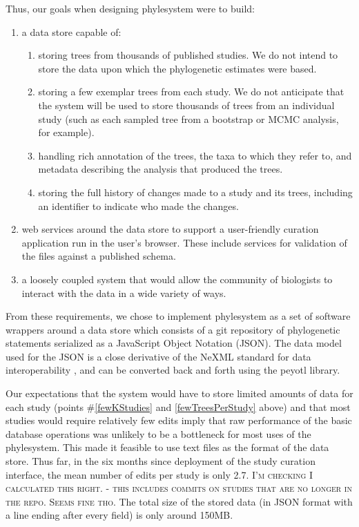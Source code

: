 \documentclass{bioinfo}
\newcommand{\ps}{phylesystem\xspace}
\newcommand{\js}{JavaScript\xspace}
\newcommand{\ejmcomment}[1]{{\color{green} \textsc{#1}}\xspace}
\begin{document}
Thus, our goals when designing \ps were to build: 
\begin{enumerate}
    \item  a data store capable of:
        \begin{enumerate}
            \item \label{fewKStudies} storing trees from thousands of published studies. We do not intend to store the 
                data upon which the phylogenetic estimates were based.
            \item \label{fewTreesPerStudy} storing a few exemplar trees from each study. We do not anticipate that the system will be used 
                to store thousands of trees from 
                an individual study (such as each sampled tree from a bootstrap or MCMC analysis, for example).
            \item \label{richAnnot} handling rich annotation of the trees, the taxa to which they refer to, and metadata describing 
                the analysis that produced the trees.
            \item \label{history} storing the full history of changes made to a study and its trees,
                including an identifier to indicate who made the changes.
        \end{enumerate}
    \item \label{ws} web services around the data store to support a user-friendly curation application run in the user's browser. These include services for validation of the files against a published schema.
    \item \label{looseOpen} a loosely coupled system that would allow the community of biologists to interact with the data in a wide variety of ways.
\end{enumerate}
From these requirements, we chose to implement \ps as a set of software wrappers around a data store
    which consists of a git \citep{git} repository of phylogenetic statements serialized as a \js Object Notation (JSON).
The data model used for the JSON is a close derivative of the NeXML standard for data interoperability \citep{NeXML},
  and can be converted back and forth using the peyotl library.

Our expectations that the system would have to store limited amounts of data for each study 
    (points \#\ref{fewKStudies} and \ref{fewTreesPerStudy} above) and that most
    studies would require relatively few edits imply that
    raw performance of the basic database operations was unlikely to be a bottleneck for most
    uses of the \ps.
This made it feasible to use text files as the format of the data store.
Thus far, in the six months since deployment of the study curation interface, the mean number of edits 
    per study is only 2.7. \ejmcomment{I'm checking I calculated this right. - this includes commits on studies that are no longer in the repo. Seems fine tho.}
The total size of the stored data (in JSON format with a line ending after 
    every field) is only around 150MB.
\end{document}
